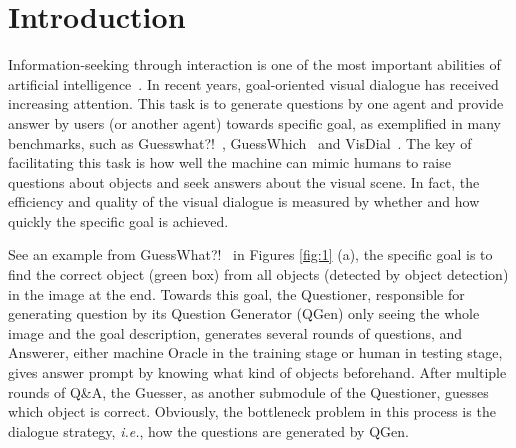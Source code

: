 

\section{Introduction}
Information-seeking through interaction is one of the most important abilities of artificial intelligence~\cite{matsumori2022study}. In recent years, goal-oriented visual dialogue has received increasing attention. This task is to generate questions by one agent and provide answer by users (or another agent) towards specific goal, as exemplified in many benchmarks, such as Guesswhat?!~\cite{de2017guesswhat}, GuessWhich~\cite{das2017learning} and VisDial~\cite{2017Visual}. %
The key of facilitating this task is how well the machine can mimic humans to raise questions about objects and seek answers about the visual scene. In fact, the efficiency and quality of the visual dialogue is measured by whether and how quickly the specific goal is achieved.


See an example from GuessWhat?!~\cite{de2017guesswhat} in Figures \ref{fig:1} (a), the specific goal is to find the correct object (green box) from all objects (detected by object detection) in the image at the end. 
Towards this goal, the Questioner, responsible for generating question by its Question Generator (QGen) only seeing the whole image and the goal description, generates several rounds of questions, and Answerer, either machine Oracle in the training stage or human in testing stage, gives answer prompt by knowing what kind of objects beforehand. After multiple rounds of Q\&A, the Guesser, as another submodule of the Questioner, guesses which object is correct.
Obviously, the bottleneck problem in this process is the dialogue strategy, {\it i.e.}, how the questions are generated by QGen.

